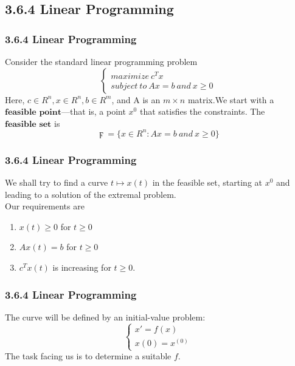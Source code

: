 \documentclass[notheorems,mathserif,table,compress]{beamer}  %
\begin{document}
\subsection{3.6.4 Linear Programming}

\begin{frame}
  \frametitle{3.6.4 Linear Programming}
  Consider the standard linear programming problem
  \begin{displaymath}
  \left\{ \begin{array}{ll}
  maximize \ c^Tx\\
  subject \ to \ Ax=b \ and \ x\ge0
  \end{array} \right.
  \end{displaymath}
  Here, $c\in R^n,x\in R^n,b\in R^m$, and A is an $m\times n$ matrix.We start with a $\textbf{feasible point}$---that is, a point $x^0$ that satisfies the constraints. The $\textbf{feasible set}$ is
  \[ \digamma=\{x\in R^n:Ax=b \ and \ x \ge0\} \]
\end{frame}


\begin{frame}
  \frametitle{3.6.4 Linear Programming}
  We shall try to find a curve $t\mapsto x(t)$ in the feasible set, starting at $x^0$ and leading to a solution of the extremal problem.\\
  Our requirements are
  \begin{enumerate}
  \item $x(t)\ge0$ for $t\ge0$
  \item $Ax(t)=b$ for $t\ge0$
  \item $c^Tx(t)$ is increasing for $t\ge0$.
  \end{enumerate}
\end{frame}


\begin{frame}
  \frametitle{3.6.4 Linear Programming}
  The curve will be defined by an initial-value problem:
  \begin{displaymath}
  \left\{ \begin{array}{ll}
  x'=f(x)\\
  x(0)=x^{(0)}
  \end{array} \right.
  \end{displaymath}
  The task facing us is to determine a suitable $f$. 
\end{frame}
\end{document}
